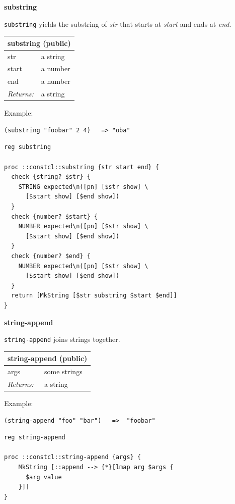 \documentclass[twoside,9pt]{report}
\begin{document}
\textbf{substring}


\texttt{substring} yields the substring of \emph{str} that starts at \emph{start} and ends at \emph{end}.

\begin{tabular}{ |l l| }
\hline
\multicolumn{2}{|l|}{substring (public)} \\
\hline
str & a string \\
start & a number \\
end & a number \\
\textit{Returns:} & a string \\
\hline
\end{tabular}


Example:

\noindent\makebox[\linewidth]{\rule{\linewidth}{0.4pt}}
\begin{lstlisting}
(substring "foobar" 2 4)   => "oba"
\end{lstlisting}
\noindent\makebox[\linewidth]{\rule{\linewidth}{0.4pt}}
\noindent\makebox[\linewidth]{\rule{\linewidth}{0.4pt}}
\begin{lstlisting}
reg substring
 
proc ::constcl::substring {str start end} {
  check {string? $str} {
    STRING expected\n([pn] [$str show] \
      [$start show] [$end show])
  }
  check {number? $start} {
    NUMBER expected\n([pn] [$str show] \
      [$start show] [$end show])
  }
  check {number? $end} {
    NUMBER expected\n([pn] [$str show] \
      [$start show] [$end show])
  }
  return [MkString [$str substring $start $end]]
}
\end{lstlisting}
\noindent\makebox[\linewidth]{\rule{\linewidth}{0.4pt}}

\textbf{string-append}


\texttt{string-append} joins strings together.

\begin{tabular}{ |l l| }
\hline
\multicolumn{2}{|l|}{string-append (public)} \\
\hline
args & some strings \\
\textit{Returns:} & a string \\
\hline
\end{tabular}


Example:

\noindent\makebox[\linewidth]{\rule{\linewidth}{0.4pt}}
\begin{lstlisting}
(string-append "foo" "bar")   =>  "foobar"
\end{lstlisting}
\noindent\makebox[\linewidth]{\rule{\linewidth}{0.4pt}}
\noindent\makebox[\linewidth]{\rule{\linewidth}{0.4pt}}
\begin{lstlisting}
reg string-append
 
proc ::constcl::string-append {args} {
    MkString [::append --> {*}[lmap arg $args {
      $arg value
    }]]
}
\end{lstlisting}
\noindent\makebox[\linewidth]{\rule{\linewidth}{0.4pt}}
\end{document}
